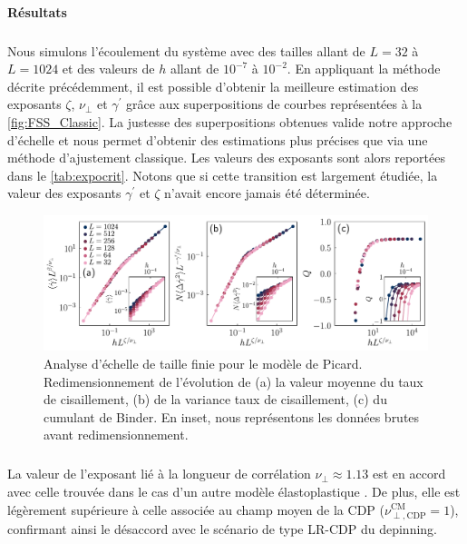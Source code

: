 \paragraph{Résultats}

\subparagraph{}Nous simulons l'écoulement du système avec des tailles allant de $L=32$ à $L=1024$ et des valeurs de $h$ allant de $10^{-7}$ à $10^{-2}$. En appliquant la méthode décrite précédemment, il est possible d'obtenir la meilleure estimation des exposants $\zeta$, $\nu_\perp$ et $\gamma^\prime$ grâce aux superpositions de courbes représentées à la \autoref{fig:FSS_Classic}. La justesse des superpositions obtenues valide notre approche d'échelle et  nous permet d'obtenir des estimations plus précises que via une méthode d'ajustement classique. Les valeurs des exposants sont alors reportées dans le \autoref{tab:expocrit}. Notons que si cette transition est largement étudiée, la valeur des exposants $\gamma^\prime$ et $\zeta$ n'avait encore jamais été déterminée.

\begin{figure}[h]
	\centering
	\includegraphics[width=\textwidth]{Chapitre4/Figures/CasPhysique/FSS_Classic_edited.pdf}
	\caption{Analyse d'échelle de taille finie pour le modèle de Picard. Redimensionnement de l'évolution de (a) la valeur moyenne du taux de cisaillement, (b) de la variance taux de cisaillement, (c) du cumulant de Binder. En inset, nous représentons les données brutes avant redimensionnement.}
	\label{fig:FSS_Classic}
\end{figure}

\subparagraph{}La valeur de l'exposant lié à la longueur de corrélation $\nu_\perp \approx 1.13$ est en accord avec celle trouvée dans le cas d'un autre modèle élastoplastique \cite{lin_scaling_2014}. De plus, elle est légèrement supérieure à celle associée au champ moyen de la CDP ($\nu_{\perp, \text{CDP}}^\text{CM}=1$), confirmant ainsi le désaccord avec le scénario de type LR-CDP du depinning. 

